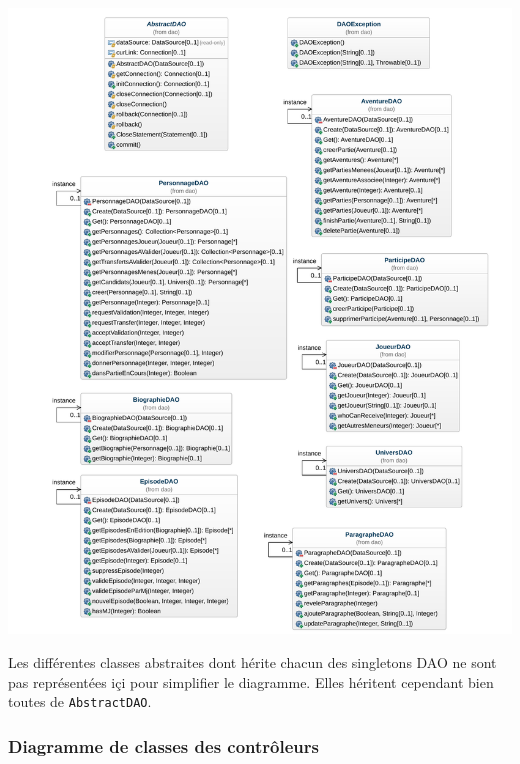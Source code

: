 \documentclass[a4paper, 11pt, titlepage]{article}
\begin{document}
\begin{center}
\includegraphics[scale=0.55]{conception/dao.pdf}
\end{center}

Les différentes classes abstraites dont hérite chacun des singletons DAO ne sont pas représentées içi pour simplifier le diagramme. Elles héritent cependant bien toutes de \lstinline!AbstractDAO!.


\subsubsection {Diagramme de classes des contrôleurs}
\end{document}
